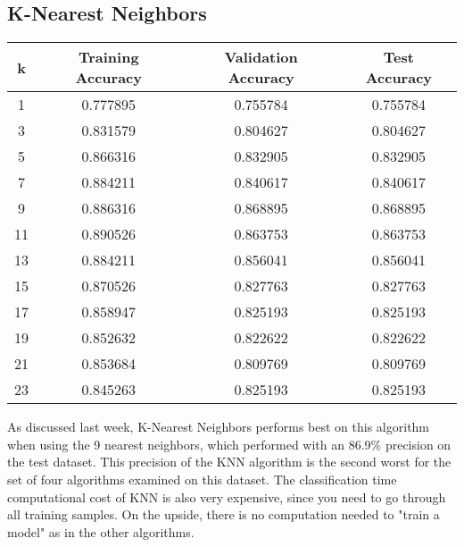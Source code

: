 \documentclass[12pt]{article}
\begin{document}
\subsection{K-Nearest Neighbors}
\begin{center}
    \begin{tabular}{| c | c | c | c |} 
    \hline
    k & Training Accuracy & Validation Accuracy & Test Accuracy \\ 
	\hline
	1 & 0.777895 & 0.755784 & 0.755784 \\
	\hline
	3 & 0.831579 & 0.804627 & 0.804627 \\
	\hline
	5 & 0.866316 & 0.832905 & 0.832905 \\
	\hline
	7 & 0.884211 & 0.840617 & 0.840617 \\
	\hline
	9 & 0.886316 & 0.868895 & 0.868895 \\
	\hline 
	11 & 0.890526 & 0.863753 & 0.863753 \\
	\hline
	13 & 0.884211 & 0.856041 & 0.856041 \\
	\hline
	15 & 0.870526 & 0.827763 & 0.827763 \\
	\hline
	17 & 0.858947 & 0.825193 & 0.825193 \\ 
	\hline
	19 & 0.852632 & 0.822622 & 0.822622 \\
	\hline
	21 & 0.853684 & 0.809769 & 0.809769 \\
	\hline
	23 & 0.845263 & 0.825193 & 0.825193 \\
	\hline
    \end{tabular}
\end{center}

As discussed last week, K-Nearest Neighbors performs best on this algorithm when using the 9 nearest neighbors, which performed with an 86.9\% precision on the test dataset. This precision of the KNN algorithm is the second worst for the set of four algorithms examined on this dataset. The classification time computational cost of KNN is also very expensive, since you need to go through all training samples. On the upside, there is no computation needed to "train a model" as in the other algorithms.
\end{document}
